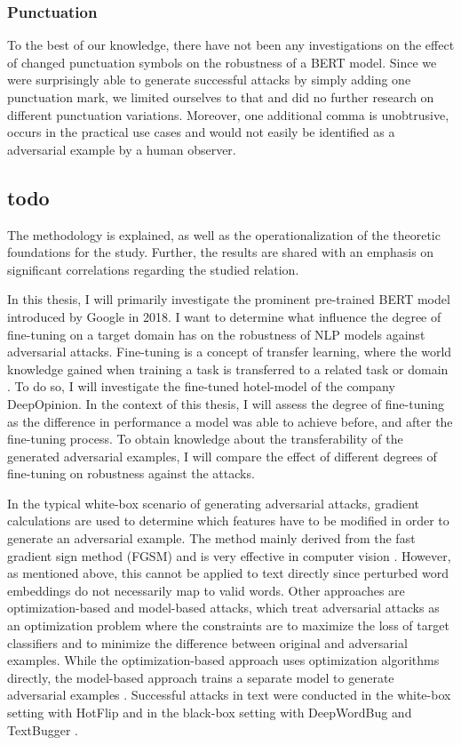 \subsubsection{Punctuation}
To the best of our knowledge, there have not been any investigations on the effect of changed punctuation symbols on the robustness of a BERT model. Since we were surprisingly able to generate successful attacks by simply adding one punctuation mark, we limited ourselves to that and did no further research on different punctuation variations. Moreover, one additional comma is unobtrusive, occurs in the practical use cases and would not easily be identified as a adversarial example by a human observer.



\subsection{todo}


The methodology is explained, as well as the operationalization of the theoretic foundations for the study. Further, the results are shared with an emphasis on significant correlations regarding the studied relation. 

In this thesis, I will primarily investigate the prominent pre-trained BERT model introduced by Google in 2018.
I want to determine what influence the degree of fine-tuning on a target domain has on the robustness of NLP models against adversarial attacks. Fine-tuning is a concept of transfer learning, where the world knowledge gained when training a task is transferred to a related task or domain \cite{pan2009survey}. To do so, I will investigate the fine-tuned hotel-model of the company DeepOpinion.
In the context of this thesis, I will assess the degree of fine-tuning as the difference in performance a model was able to achieve before, and after the fine-tuning process. 
To obtain knowledge about the transferability of the generated adversarial examples, I will compare the effect of different degrees of fine-tuning on robustness against the attacks. 




In the typical white-box scenario of generating adversarial attacks, gradient calculations are used to determine which features have to be modified in order to generate an adversarial example. The method mainly derived from the fast gradient sign method (FGSM) and is very effective in computer vision \cite{goodfellow2014explaining}. However, as mentioned above, this cannot be applied to text directly since perturbed word embeddings do not necessarily map to valid words. Other approaches are optimization-based and model-based attacks, which treat adversarial attacks as an optimization problem where the constraints are to maximize the loss of target classifiers and to minimize the difference between original and adversarial examples. While the optimization-based approach uses optimization algorithms directly, the model-based approach trains a separate model to generate adversarial examples \cite{xu2020elephant}. Successful attacks in text were conducted in the white-box setting with HotFlip \cite{ebrahimi2017hotflip} and in the black-box setting with DeepWordBug \cite{gao2018black} and TextBugger \cite{li2018textbugger}. 

